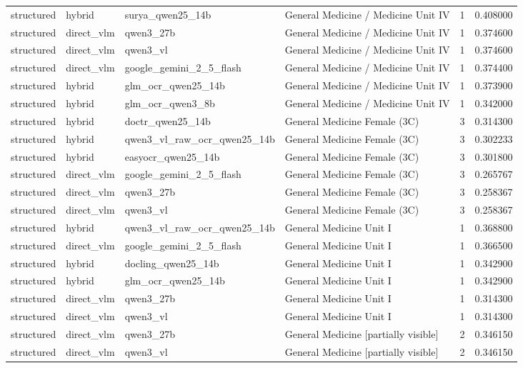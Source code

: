 \begin{tabular}{llllrr}
structured & hybrid & surya\_qwen25\_14b & General Medicine / Medicine Unit IV & 1 & 0.408000 \\
structured & direct\_vlm & qwen3\_27b & General Medicine / Medicine Unit IV & 1 & 0.374600 \\
structured & direct\_vlm & qwen3\_vl & General Medicine / Medicine Unit IV & 1 & 0.374600 \\
structured & direct\_vlm & google\_gemini\_2\_5\_flash & General Medicine / Medicine Unit IV & 1 & 0.374400 \\
structured & hybrid & glm\_ocr\_qwen25\_14b & General Medicine / Medicine Unit IV & 1 & 0.373900 \\
structured & hybrid & glm\_ocr\_qwen3\_8b & General Medicine / Medicine Unit IV & 1 & 0.342000 \\
structured & hybrid & doctr\_qwen25\_14b & General Medicine Female (3C) & 3 & 0.314300 \\
structured & hybrid & qwen3\_vl\_raw\_ocr\_qwen25\_14b & General Medicine Female (3C) & 3 & 0.302233 \\
structured & hybrid & easyocr\_qwen25\_14b & General Medicine Female (3C) & 3 & 0.301800 \\
structured & direct\_vlm & google\_gemini\_2\_5\_flash & General Medicine Female (3C) & 3 & 0.265767 \\
structured & direct\_vlm & qwen3\_27b & General Medicine Female (3C) & 3 & 0.258367 \\
structured & direct\_vlm & qwen3\_vl & General Medicine Female (3C) & 3 & 0.258367 \\
structured & hybrid & qwen3\_vl\_raw\_ocr\_qwen25\_14b & General Medicine Unit I & 1 & 0.368800 \\
structured & direct\_vlm & google\_gemini\_2\_5\_flash & General Medicine Unit I & 1 & 0.366500 \\
structured & hybrid & docling\_qwen25\_14b & General Medicine Unit I & 1 & 0.342900 \\
structured & hybrid & glm\_ocr\_qwen25\_14b & General Medicine Unit I & 1 & 0.342900 \\
structured & direct\_vlm & qwen3\_27b & General Medicine Unit I & 1 & 0.314300 \\
structured & direct\_vlm & qwen3\_vl & General Medicine Unit I & 1 & 0.314300 \\
structured & direct\_vlm & qwen3\_27b & General Medicine [partially visible] & 2 & 0.346150 \\
structured & direct\_vlm & qwen3\_vl & General Medicine [partially visible] & 2 & 0.346150 \\

\end{tabular}

